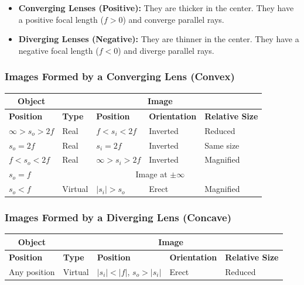\begin{itemize}
    \item \textbf{Converging Lenses (Positive):} They are thicker in the center. They have a positive focal length ($f > 0$) and converge parallel rays.
    \item \textbf{Diverging Lenses (Negative):} They are thinner in the center. They have a negative focal length ($f < 0$) and diverge parallel rays.
\end{itemize}

\vspace{1cm}

\subsubsection*{Images Formed by a Converging Lens (Convex)}
\begin{center}
\begin{tabular}{|l|llll|}
\hline
\multicolumn{1}{|c|}{\textbf{Object}} & \multicolumn{4}{c|}{\textbf{Image}} \\ \hline
\textbf{Position} & \textbf{Type} & \textbf{Position} & \textbf{Orientation} & \textbf{Relative Size} \\ \hline
$\infty > s_o > 2f$ & Real & $f < s_i < 2f$ & Inverted & Reduced \\
$s_o = 2f$ & Real & $s_i = 2f$ & Inverted & Same size \\
$f < s_o < 2f$ & Real & $\infty > s_i > 2f$ & Inverted & Magnified \\
$s_o = f$ & \multicolumn{4}{c|}{Image at $\pm \infty$} \\
$s_o < f$ & Virtual & $|s_i| > s_o$ & Erect & Magnified \\ \hline
\end{tabular}
\end{center}

\vspace{1cm}

\subsubsection*{Images Formed by a Diverging Lens (Concave)}
\begin{center}
\begin{tabular}{|l|llll|}
\hline
\multicolumn{1}{|c|}{\textbf{Object}} & \multicolumn{4}{c|}{\textbf{Image}} \\ \hline
\textbf{Position} & \textbf{Type} & \textbf{Position} & \textbf{Orientation} & \textbf{Relative Size} \\ \hline
Any position & Virtual & $|s_i| < |f|$, $s_o > |s_i|$ & Erect & Reduced \\ \hline
\end{tabular}
\end{center}

